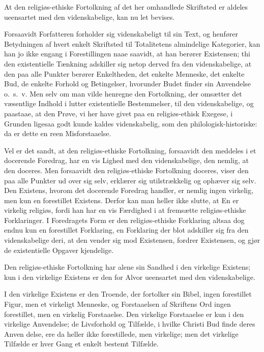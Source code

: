 \documentclass[12pt,a4paper]{book}
\newcommand{\opage}[1]{\marginnote{\footnotesize\textit{[#1]}}}
\begin{document}
At den religiøs-ethiske Fortolkning af det her omhandlede Skriftsted er
aldeles ueensartet med den videnskabelige, kan nu let bevises.

Forsaavidt Forfatteren forholder sig videnskabeligt til sin Text, og henfører
Betydningen af hvert enkelt Skriftsted til Totalitetens almindelige
Kategorier, kan han jo ikke engang i Forestillingen naae saavidt, at han
berører Existensen; thi den
\opage{74} existentielle Tænkning adskiller sig netop derved fra den videnskabelige, at
den paa alle Punkter berører Enkeltheden, det enkelte Menneske, det enkelte
Bud, de enkelte Forhold og Betingelser, hvorunder Budet finder sin Anvendelse
o.\ s.\ v. Men selv om man vilde henregne den Fortolkning, der omsætter det
væsentlige Indhold i lutter existentielle Bestemmelser, til den
videnskabelige, og paastaae, at den Prøve, vi her have givet paa en
religiøs-ethisk Exegese, i Grunden ligesaa godt kunde kaldes videnskabelig,
som den philologisk-historiske: da er dette en reen Misforstaaelse.

Vel er det sandt, at den religiøs-ethiske Fortolkning, forsaavidt den
meddeles i et docerende Foredrag, har en vis Lighed med den videnskabelige,
den nemlig, at den doceres. Men forsaavidt den religiøs-ethiske Fortolkning
doceres, viser den paa alle Punkter ud over sig selv, erklærer sig
utilstrækkelig og ophæver sig selv. Den Existens, hvorom det docerende
Foredrag handler, er nemlig ingen virkelig, men kun en forestillet Existens.
Derfor kan man heller ikke slutte, at En er virkelig religiøs, fordi han har
en vis Færdighed i at fremsætte religiøs-ethiske Forklaringer. I Foredragets
Form er den religiøs-ethiske Forklaring altsaa dog endnu kun en forestillet
Forklaring, en Forklaring der blot adskiller sig fra den videnskabelige deri,
at den vender sig mod Existensen, fordrer Existensen, og gjør de existentielle
Opgaver kjendelige.

Den religiøs-ethiske Fortolkning har alene sin Sandhed i den virkelige
Existens; kun i den virkelige Existens er den for Alvor ueensartet med den
videnskabelige.

I den virkelige Existens er den Troende, der fortolker sin Bibel, ingen
forestillet Figur, men et virkeligt Menneske, og Forstaaelsen af Skriftens
Ord ingen forestillet, men en virkelig Forstaaelse. Den virkelige Forstaaelse
er kun i den virkelige Anvendelse; de Livsforhold og Tilfælde, i hvilke
Christi Bud finde deres Anven\-%
\opage{75}delse, ere da heller ikke forestillede, men virkelige; men det virkelige
Tilfælde er hver Gang et enkelt bestemt Tilfælde.
\end{document}

